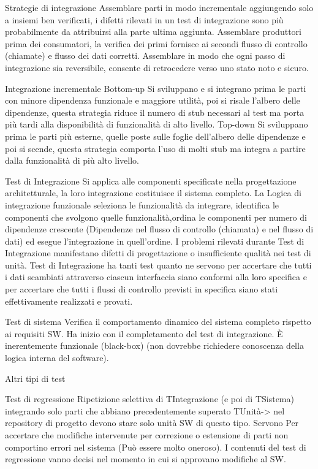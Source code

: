 \documentclass{report}
\begin{document}
Strategie di integrazione
Assemblare parti in modo incrementale aggiungendo solo a insiemi ben verificati, i difetti rilevati in un test di integrazione sono più probabilmente da attribuirsi alla parte ultima aggiunta.
Assemblare produttori prima dei consumatori, la verifica dei primi fornisce ai secondi flusso di controllo (chiamate) e flusso dei dati corretti.
Assemblare in modo che ogni passo di integrazione sia reversibile, consente di retrocedere verso uno stato noto e sicuro.

Integrazione incrementale
Bottom-up
Si sviluppano e si integrano prima le parti con minore dipendenza funzionale e maggiore utilità, poi si risale l’albero delle dipendenze, questa strategia riduce il numero di stub necessari al test ma porta più tardi alla disponibilità di funzionalità di alto livello.
Top-down
Si sviluppano prima le parti più esterne, quelle poste sulle foglie dell’albero delle dipendenze e poi si scende, questa strategia comporta l’uso di molti stub ma integra a partire dalla funzionalità di più alto livello.

Test di Integrazione
Si applica alle componenti specificate nella progettazione architetturale, la loro integrazione costituisce il sistema completo.
La Logica di integrazione funzionale seleziona le funzionalità da integrare, identifica le componenti che svolgono quelle funzionalità,ordina le componenti per numero di dipendenze crescente (Dipendenze nel flusso di controllo (chiamata) e nel flusso di dati) ed esegue l’integrazione in quell’ordine.
I problemi rilevati durante Test di Integrazione manifestano difetti di progettazione o insufficiente qualità nei test di unità.
Test di Integrazione ha tanti test quanto ne servono per accertare che tutti i dati scambiati attraverso ciascun interfaccia siano conformi alla loro specifica e per accertare che tutti i flussi di controllo previsti in specifica siano stati effettivamente realizzati e provati.

Test di sistema
Verifica il comportamento dinamico del sistema completo rispetto ai requisiti SW.
Ha inizio con il completamento del test di integrazione.
È inerentemente funzionale (black-box) (non dovrebbe richiedere conoscenza della logica interna del software).


Altri tipi di test

Test di regressione
Ripetizione selettiva di TIntegrazione (e poi di TSistema) integrando solo parti che abbiano precedentemente superato TUnità-> nel repository di progetto devono stare solo unità SW di questo tipo.
Servono Per accertare che modifiche intervenute per correzione o estensione di parti non comportino errori nel sistema (Può essere molto oneroso).
I contenuti del test di regressione vanno decisi nel momento in cui si approvano modifiche al SW.
\end{document}
